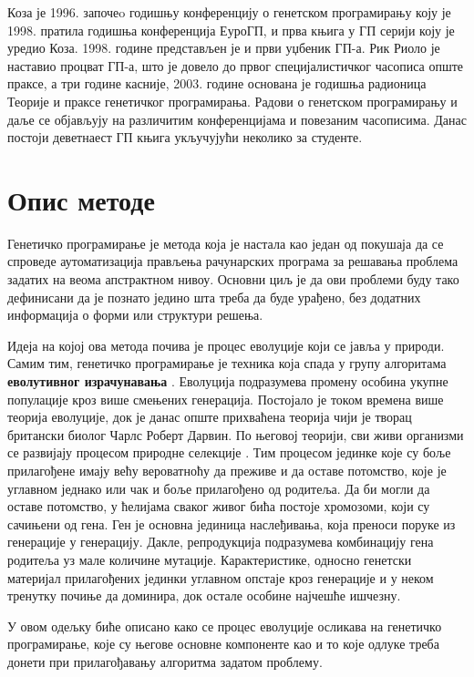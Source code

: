 \documentclass[a4paper]{article}
\begin{document}
Коза је 1996. започеo годишњу конференцију о генетском програмирању  коју је 1998. пратила годишња конференција ЕуроГП, и прва књига у ГП серији коју је уредио Коза. 1998. године представљен је и први уџбеник ГП-а. Рик Риоло је наставио процват ГП-а, што је довело до првог специјалистичког часописа опште праксе, а три године касније, 2003. године основана је годишња радионица Теорије и праксе генетичког програмирања. Радови о генетском програмирању и даље се објављују на различитим конференцијама и повезаним часописима. Данас постоји деветнаест ГП књига укључујући неколико за студенте.

\section{Опис методе}

Генетичко програмирање је метода која је настала као један од покушаја да се спроведе аутоматизација прављења рачунарских програма за решавања проблема задатих на веома апстрактном нивоу. Основни циљ је да ови проблеми буду тако дефинисани да је познато једино шта треба да буде урађено, без додатних информација о форми или структури решења.\newline

Идеја на којој ова метода почива је процес еволуције који се јавља у природи. Самим тим, генетичко програмирање је техника која спада у групу алгоритама  \textbf{еволутивног израчунавања} \cite{compIntelligence}. Еволуција подразумева промену особина укупне популације кроз више смењених генерација. Постојало је током времена више теорија еволуције, док је данас опште прихваћена теорија чији је творац британски биолог Чарлс Роберт Дарвин. По његовој теорији, сви живи организми се развијају процесом природне селекције \cite{darwin1859}. Тим процесом јединке које су боље прилагођене имају већу вероватноћу да преживе и да оставе потомство, које је углавном једнако или чак и боље прилагођено од родитеља. Да би могли да оставе потомство, у ћелијама сваког живог бића постоје хромозоми, који су сачињени од гена. Ген је основна јединица наслеђивања, која преноси поруке из генерације у генерацију. Дакле, репродукција подразумева комбинацију гена родитеља уз мале количине мутације. Карактеристике, односно генетски материјал прилагођених јединки углавном опстаје кроз генерације и у неком тренутку почиње да доминира, док остале особине најчешће ишчезну.\newline

У овом одељку биће описано како се процес еволуције осликава на генетичко програмирање, које су његове основне компоненте као и то које одлуке треба донети при прилагођавању алгоритма задатом проблему.
\end{document}
